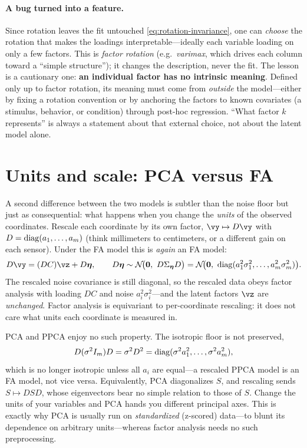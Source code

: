 \documentclass[11pt]{article}
\theoremstyle{plain}
\theoremstyle{definition}
\theoremstyle{remark}
\theoremstyle{definition}
\newcommand{\veta}{\bm{\eta}}
\newcommand{\Normal}{\mathcal{N}}
\begin{document}
\paragraph{A bug turned into a feature.} Since rotation leaves the fit untouched
\eqref{eq:rotation-invariance}, one can \emph{choose} the rotation that makes the
loadings interpretable---ideally each variable loading on only a few factors.
This is \emph{factor rotation} (e.g.\ \emph{varimax}, which drives each column
toward a ``simple structure''); it changes the description, never the fit. The
lesson is a cautionary one: \textbf{an individual factor has no intrinsic meaning}.
Defined only up to factor rotation, its meaning must come from \emph{outside} the
model---either by fixing a rotation convention or by anchoring the factors to
known covariates (a stimulus, behavior, or condition) through post-hoc
regression. ``What factor $k$ represents'' is always a statement about that
external choice, not about the latent model alone.

\section{Units and scale: PCA versus FA}\label{sec:scale}

A second difference between the two models is subtler than the noise floor but
just as consequential: what happens when you change the \emph{units} of the
observed coordinates. Rescale each coordinate by its own factor,
$\vy \mapsto D\vy$ with $D = \operatorname{diag}(a_1, \dots, a_m)$ (think millimeters to
centimeters, or a different gain on each sensor). Under the FA model this is
\emph{again} an FA model:
\begin{equation}\label{eq:fa-rescale}
    D\vy = (DC)\vz + D\veta, \qquad
    D\veta \sim \Normal\!\big(\mathbf 0,\ D\Sigma_{\veta}D\big)
          = \Normal\!\big(\mathbf 0,\ \diag(a_1^2\sigma_1^2, \dots, a_m^2\sigma_m^2)\big).
\end{equation}
The rescaled noise covariance is still diagonal, so the rescaled data obeys
factor analysis with loading $DC$ and noise $a_i^2\sigma_i^2$---and the latent
factors $\vz$ are \emph{unchanged}. Factor analysis is equivariant to
per-coordinate rescaling: it does not care what units each coordinate is measured
in.

PCA and PPCA enjoy no such property. The isotropic floor is not preserved,
\begin{equation}
    D(\sigma^2 I_m)D = \sigma^2 D^2 = \operatorname{diag}(\sigma^2 a_1^2, \dots, \sigma^2 a_m^2),
\end{equation}
which is no longer isotropic unless all $a_i$ are equal---a rescaled PPCA model
is an FA model, not vice versa. Equivalently, PCA diagonalizes $S$, and rescaling
sends $S \mapsto DSD$, whose eigenvectors bear no simple relation to those of $S$.
Change the units of your variables and PCA hands you different principal axes.
This is exactly why PCA is usually run on \emph{standardized} (z-scored) data---to
blunt its dependence on arbitrary units---whereas factor analysis needs no such
preprocessing.
\end{document}
